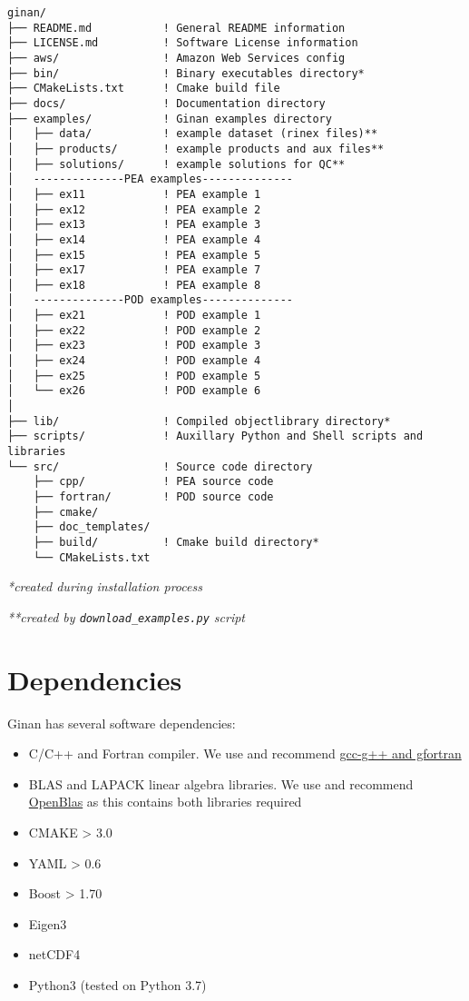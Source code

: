 \begin{verbatim}
ginan/
├── README.md           ! General README information
├── LICENSE.md          ! Software License information
├── aws/                ! Amazon Web Services config
├── bin/                ! Binary executables directory*
├── CMakeLists.txt      ! Cmake build file
├── docs/               ! Documentation directory
├── examples/           ! Ginan examples directory
│   ├── data/           ! example dataset (rinex files)**
│   ├── products/       ! example products and aux files**
│   ├── solutions/      ! example solutions for QC**
│   --------------PEA examples--------------
│   ├── ex11            ! PEA example 1
│   ├── ex12            ! PEA example 2
│   ├── ex13            ! PEA example 3
│   ├── ex14            ! PEA example 4
│   ├── ex15            ! PEA example 5
│   ├── ex17            ! PEA example 7
│   ├── ex18            ! PEA example 8
│   --------------POD examples--------------
│   ├── ex21            ! POD example 1
│   ├── ex22            ! POD example 2
│   ├── ex23            ! POD example 3
│   ├── ex24            ! POD example 4
│   ├── ex25            ! POD example 5
│   └── ex26            ! POD example 6
│
├── lib/                ! Compiled objectlibrary directory*
├── scripts/            ! Auxillary Python and Shell scripts and libraries
└── src/                ! Source code directory
    ├── cpp/            ! PEA source code
    ├── fortran/        ! POD source code
    ├── cmake/   
    ├── doc_templates/
    ├── build/          ! Cmake build directory*
    └── CMakeLists.txt
\end{verbatim}

\emph{*created during installation process}

\emph{**created by \texttt{download\_examples.py} script}\\


\section{Dependencies}\label{dependencies}

Ginan has several software dependencies:

\begin{itemize}
\item
  C/C++ and Fortran compiler. We use and recommend
  \href{https://gcc.gnu.org}{gcc-g++ and gfortran}
\item
  BLAS and LAPACK linear algebra libraries. We use and recommend
  \href{https://www.openblas.net/}{OpenBlas} as this contains both
  libraries required
\item
  CMAKE \textgreater{} 3.0
\item
  YAML \textgreater{} 0.6
\item
  Boost \textgreater{} 1.70
\item
  Eigen3
\item
  netCDF4
\item
  Python3 (tested on Python 3.7)\\
\end{itemize}

